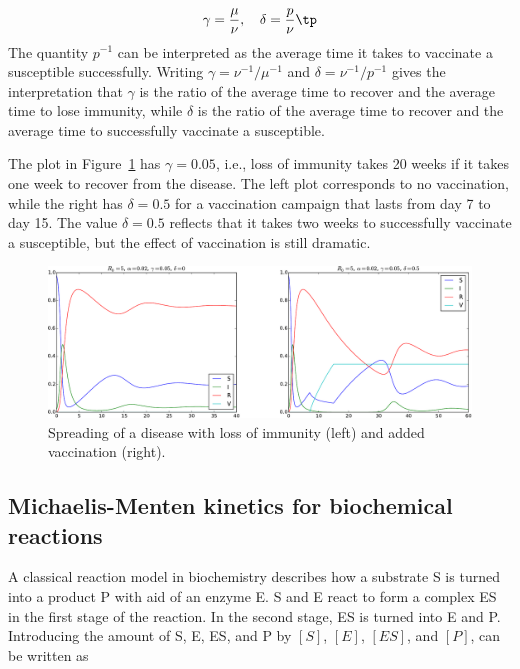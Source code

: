 \documentclass[graybox,envcountchap,sectrefs,final]{svmonodo}
\begin{document}
\[ \gamma = \frac{\mu}{\nu},\quad \delta = \frac{p}{\nu}\tp \]
The quantity $p^{-1}$ can be interpreted as the average time it takes
to vaccinate a susceptible successfully. Writing $\gamma = \nu^{-1}/\mu^{-1}$
and $\delta = \nu^{-1}/p^{-1}$ gives the interpretation that $\gamma$
is the ratio of the average time to recover and the average time to
lose immunity, while $\delta$ is the ratio of the average time to recover
and the average time to successfully vaccinate a susceptible.

The plot in Figure~\ref{sec:scale:SIRV:fig} has $\gamma = 0.05$, i.e.,
loss of immunity takes 20 weeks if it takes one week to recover from
the disease. The left plot corresponds to no vaccination, while the
right has $\delta = 0.5$ for a vaccination campaign that lasts from
day 7 to day 15. The value $\delta =0.5$ reflects that
it takes two weeks to successfully
vaccinate a susceptible, but the effect of vaccination is still dramatic.


\begin{figure}[!ht]  %
  \centerline{\includegraphics[width=1.0\linewidth]{fig-scaling/SIRV2.pdf}}
  \caption{
  Spreading of a disease with loss of immunity (left) and added vaccination (right). \label{sec:scale:SIRV:fig}
  }
\end{figure}



\subsection{Michaelis-Menten kinetics for biochemical reactions}
\label{scale:MMK}

A classical reaction model in biochemistry describes how a
substrate S is turned into a product P with aid of an enzyme E.
S and E react to form a complex ES in the first stage of the reaction.
In the second stage, ES is turned into E and P.
Introducing the amount of S, E, ES, and P by $[S]$, $[E]$, $[ES]$, and
$[P]$, can be written as
\end{document}
